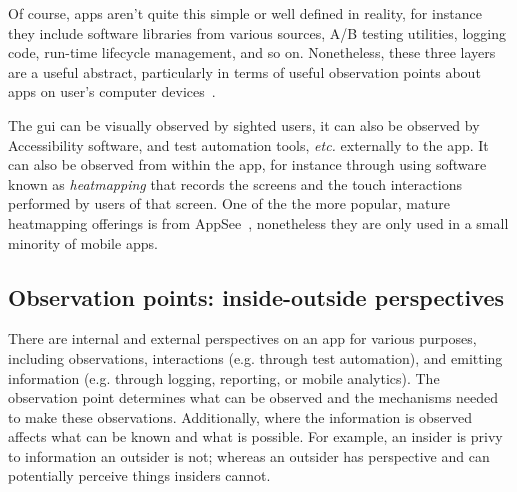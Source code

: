 Of course, apps aren't quite this simple or well defined in reality, for instance they include software libraries from various sources, A/B testing utilities, logging code, run-time lifecycle management, and so on. Nonetheless, these three layers are a useful abstract, particularly in terms of useful observation points about apps on user's computer devices~.

The \Gls{gui} can be visually observed by sighted users, it can also be observed by Accessibility software, and test automation tools, \emph{etc.} externally to the app. It can also be observed from within the app, for instance through using software known as \emph{heatmapping} that records the screens and the touch interactions performed by users of that screen. One of the the more popular, mature heatmapping offerings is from AppSee~, nonetheless they are only used in a small minority of mobile apps.


\subsection{Observation points: inside-outside perspectives}
There are internal and external perspectives on an app for various purposes, including observations, interactions (e.g. through test automation), and emitting information (e.g. through logging, reporting, or mobile analytics). The observation point determines what can be observed and the mechanisms needed to make these observations. Additionally, where the information is observed affects what can be known and what is possible. For example, an insider is privy to information an outsider is not; whereas an outsider has perspective and can potentially perceive things insiders cannot.


